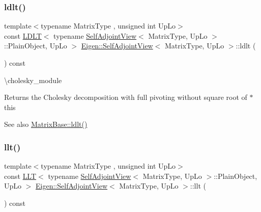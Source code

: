 \subsubsection{\texorpdfstring{ldlt()}{ldlt()}}
{\footnotesize\ttfamily template$<$typename Matrix\+Type , unsigned int Up\+Lo$>$ \\
const \mbox{\hyperlink{class_eigen_1_1_l_d_l_t}{L\+D\+LT}}$<$ typename \mbox{\hyperlink{class_eigen_1_1_self_adjoint_view}{Self\+Adjoint\+View}}$<$ Matrix\+Type, Up\+Lo $>$\+::Plain\+Object, Up\+Lo $>$ \mbox{\hyperlink{class_eigen_1_1_self_adjoint_view}{Eigen\+::\+Self\+Adjoint\+View}}$<$ Matrix\+Type, Up\+Lo $>$\+::ldlt (\begin{DoxyParamCaption}{ }\end{DoxyParamCaption}) const\hspace{0.3cm}{\ttfamily [inline]}}

\textbackslash{}cholesky\+\_\+module \begin{DoxyReturn}{Returns}
the Cholesky decomposition with full pivoting without square root of {\ttfamily $\ast$this} 
\end{DoxyReturn}
\begin{DoxySeeAlso}{See also}
\mbox{\hyperlink{class_eigen_1_1_matrix_base_a0ecf058a0727a4cab8b42d79e95072e1}{Matrix\+Base\+::ldlt()}} 
\end{DoxySeeAlso}
\mbox{\label{class_eigen_1_1_self_adjoint_view_a405e810491642a7f7b785f2ad6f93619}} 
\subsubsection{\texorpdfstring{llt()}{llt()}}
{\footnotesize\ttfamily template$<$typename Matrix\+Type , unsigned int Up\+Lo$>$ \\
const \mbox{\hyperlink{class_eigen_1_1_l_l_t}{L\+LT}}$<$ typename \mbox{\hyperlink{class_eigen_1_1_self_adjoint_view}{Self\+Adjoint\+View}}$<$ Matrix\+Type, Up\+Lo $>$\+::Plain\+Object, Up\+Lo $>$ \mbox{\hyperlink{class_eigen_1_1_self_adjoint_view}{Eigen\+::\+Self\+Adjoint\+View}}$<$ Matrix\+Type, Up\+Lo $>$\+::llt (\begin{DoxyParamCaption}{ }\end{DoxyParamCaption}) const\hspace{0.3cm}{\ttfamily [inline]}}

